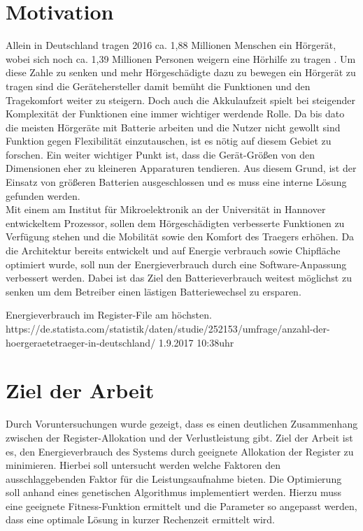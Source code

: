 \section{Motivation}
\label{sec:motivation}
Allein in Deutschland tragen 2016 ca. 1,88 Millionen Menschen ein Hörgerät, wobei sich noch ca. 1,39 Millionen Personen weigern eine Hörhilfe zu tragen  \cite{statistica}. Um diese Zahle zu senken und mehr Hörgeschädigte dazu zu bewegen ein Hörgerät zu tragen sind die Gerätehersteller damit bemüht die Funktionen und den Tragekomfort weiter zu steigern. Doch auch die Akkulaufzeit spielt bei steigender Komplexität der Funktionen eine immer wichtiger werdende Rolle. Da bis dato die meisten Hörgeräte mit Batterie arbeiten und die Nutzer nicht gewollt sind Funktion gegen Flexibilität einzutauschen, ist es nötig auf diesem Gebiet zu forschen. Ein weiter wichtiger Punkt ist, dass die Gerät-Größen von den Dimensionen eher zu kleineren Apparaturen tendieren. Aus diesem Grund, ist der Einsatz von größeren Batterien ausgeschlossen und es muss eine interne Lösung gefunden werden.\\
Mit einem am Institut für Mikroelektronik an der Universität in Hannover entwickeltem Prozessor, sollen dem Hörgeschädigten verbesserte Funktionen zu Verfügung stehen und die Mobilität sowie den Komfort des Traegers erhöhen. Da die Architektur bereits entwickelt und auf Energie verbrauch sowie Chipfläche optimiert wurde, soll nun der Energieverbrauch durch eine Software-Anpassung verbessert werden.
Dabei ist das Ziel den Batterieverbrauch weitest möglichst zu senken um dem Betreiber einen lästigen Batteriewechsel zu ersparen.

Energieverbrauch im Register-File am höchsten.
https://de.statista.com/statistik/daten/studie/252153/umfrage/anzahl-der-hoergeraetetraeger-in-deutschland/ 1.9.2017 10:38uhr

\section{Ziel der Arbeit}
\label{sec:ziele}
Durch Voruntersuchungen wurde gezeigt, dass es einen deutlichen Zusammenhang zwischen der Register-Allokation und der Verlustleistung gibt. Ziel der Arbeit ist es, den Energieverbrauch des Systems durch geeignete Allokation der Register zu minimieren. Hierbei soll untersucht werden welche Faktoren den ausschlaggebenden Faktor für die Leistungsaufnahme bieten. Die Optimierung soll anhand eines genetischen Algorithmus implementiert werden. Hierzu muss eine geeignete Fitness-Funktion ermittelt und die Parameter so angepasst werden, dass eine optimale Lösung in kurzer Rechenzeit ermittelt wird.

